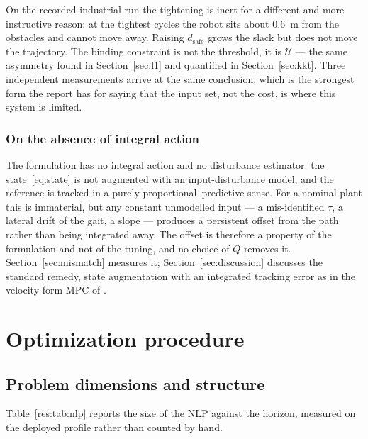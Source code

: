 \documentclass[11pt,a4paper]{article}
\newcommand{\dsafe}{d_{\mathrm{safe}}}
\begin{document}
On the recorded industrial run the tightening is inert for a different and more instructive reason: at the
tightest cycles the robot sits about $0.6$~m from the obstacles and cannot move away. Raising $\dsafe$ grows
the slack but does not move the trajectory. The binding constraint is not the threshold, it is
$\mathcal{U}$ --- the same asymmetry found in Section~\ref{sec:l1} and quantified in Section~\ref{sec:kkt}.
Three independent measurements arrive at the same conclusion, which is the strongest form the report has for
saying that the input set, not the cost, is where this system is limited.


\subsubsection{On the absence of integral action}
\label{sec:integral}

The formulation has no integral action and no disturbance estimator: the state~\eqref{eq:state} is not
augmented with an input-disturbance model, and the reference is tracked in a purely
proportional--predictive sense. For a nominal plant this is immaterial, but any constant unmodelled input ---
a mis-identified $\tau$, a lateral drift of the gait, a slope --- produces a persistent offset from the path
rather than being integrated away. The offset is therefore a property of the formulation and not of the
tuning, and no choice of $Q$ removes it. Section~\ref{sec:mismatch} measures it;
Section~\ref{sec:discussion} discusses the standard remedy, state augmentation with an integrated tracking
error as in the velocity-form MPC of \cite{rawlings2017mpc}.

\section{Optimization procedure}
\label{sec:optproc}

\subsection{Problem dimensions and structure}
\label{sec:dims}

Table~\ref{res:tab:nlp} reports the size of the NLP against the horizon, measured on the deployed profile
rather than counted by hand.

\begin{table}[htbp]
  \centering
  \small
  \caption{%
  Size and sparsity of the NLP against the prediction horizon, from the deployed profile. Bold: the
  deployed configuration.}
  \label{res:tab:nlp}
\end{table}
\end{document}
